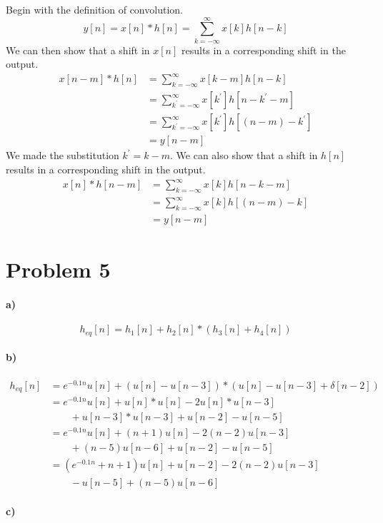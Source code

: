 \documentclass[12pt]{article}
\begin{document}
Begin with the definition of convolution.
\[y[n]=x[n]*h[n]=\sum_{k=-\infty}^\infty x[k]h[n-k]\]
We can then show that a shift in \(x[n]\) results in a corresponding shift in the output.
\begin{align*}
    x[n-m]*h[n]&=\sum_{k=-\infty}^\infty x[k-m]h[n-k]\\
    &=\sum_{k^\prime=-\infty}^\infty x[k^\prime]h[n-k^\prime-m]\\
    &=\sum_{k^\prime=-\infty}^\infty x[k^\prime]h[(n-m)-k^\prime]\\
    &=y[n-m]
\end{align*}
We made the substitution \(k^\prime=k-m\). We can also show that a shift in \(h[n]\) results in a
corresponding shift in the output.
\begin{align*}
    x[n]*h[n-m]&=\sum_{k=-\infty}^\infty x[k]h[n-k-m]\\
    &=\sum_{k=-\infty}^\infty x[k]h[(n-m)-k]\\
    &=y[n-m]
\end{align*}

\section*{Problem 5}

\paragraph{a)}

\[h_{eq}[n]=h_1[n]+h_2[n]*(h_3[n]+h_4[n])\]

\paragraph{b)}

\begin{align*}
    h_{eq}[n]&=e^{-0.1n}u[n] + (u[n]-u[n-3])*(u[n]-u[n-3]+\delta[n-2])\\
    &=e^{-0.1n}u[n] + u[n]*u[n] - 2u[n]*u[n-3]\\
    &\qquad+ u[n-3]*u[n-3] + u[n-2] - u[n-5]\\
    &=e^{-0.1n}u[n] + (n+1)u[n] - 2(n-2)u[n-3]\\
    &\qquad+ (n-5)u[n-6] + u[n-2] - u[n-5]\\
    &=(e^{-0.1n}+n+1)u[n] + u[n-2] - 2(n-2)u[n-3]\\
    &\qquad- u[n-5] + (n-5)u[n-6]
\end{align*}

\paragraph{c)}
\end{document}
